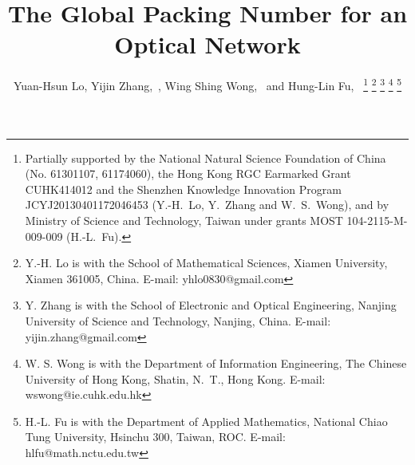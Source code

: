 \documentclass[journal,draftcls,onecolumn,12pt,twoside]{IEEEtran}
\begin{document}
\title{The Global Packing Number for an Optical Network}

\author{Yuan-Hsun Lo, Yijin Zhang,~, Wing Shing Wong,~ and Hung-Lin Fu,~
\thanks{Partially supported by the National Natural Science Foundation of China (No. 61301107, 61174060), the Hong Kong RGC Earmarked Grant CUHK414012 and the Shenzhen Knowledge Innovation Program JCYJ20130401172046453 (Y.-H.~Lo, Y.~Zhang and W.~S.~Wong), and by Ministry of Science and Technology, Taiwan under grants MOST 104-2115-M-009-009 (H.-L.~Fu).}
\thanks{Y.-H. Lo is with the School of Mathematical Sciences, Xiamen University, Xiamen 361005, China. E-mail: yhlo0830@gmail.com}
\thanks{Y. Zhang is with the School of Electronic and Optical Engineering, Nanjing University of Science and Technology, Nanjing, China.
E-mail: yijin.zhang@gmail.com}
\thanks{W. S. Wong is with the Department of Information Engineering, The Chinese University of Hong Kong, Shatin, N.~T., Hong Kong.
E-mail: wswong@ie.cuhk.edu.hk}
\thanks{H.-L. Fu is with the Department of Applied Mathematics, National Chiao Tung University, Hsinchu 300, Taiwan, ROC. E-mail: hlfu@math.nctu.edu.tw}
}
\maketitle
\end{document}
